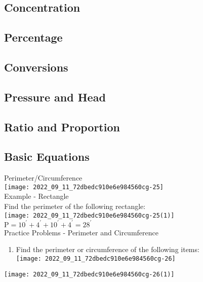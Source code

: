 \subsection{Concentration}
\subsection{Percentage}
\subsection{Conversions}
\subsection{Pressure and Head}
\subsection{Ratio and Proportion}
\subsection{Basic Equations}
Perimeter/Circumference\\
\texttt{[image: 2022\_09\_11\_72dbedc910e6e984560cg-25]}\\

Example - Rectangle\\

Find the perimeter of the following rectangle:\\

\texttt{[image: 2022\_09\_11\_72dbedc910e6e984560cg-25(1)]}\\

$\mathrm{P}=10^{\prime}+4^{\prime}+10^{\prime}+4^{\prime}=28^{\prime}$\\

Practice Problems - Perimeter and Circumference
\begin{enumerate}
  \item Find the perimeter or circumference of the following items:\\

\texttt{[image: 2022\_09\_11\_72dbedc910e6e984560cg-26]}
\end{enumerate}
\texttt{[image: 2022\_09\_11\_72dbedc910e6e984560cg-26(1)]}\\

